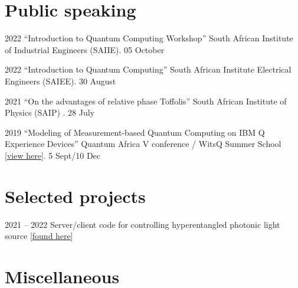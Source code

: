 \documentclass[10pt]{extreport}
\begin{document}
    \section*{Public speaking}

    \begin{tablist}
          \item[2022] \tab{}\enquote{Introduction to Quantum Computing Workshop} South African Institute of Industrial Engineers (SAIIE). 05 October
          \item[2022] \tab{}\enquote{Introduction to Quantum Computing} South African Institute Electrical Engineers (SAIEE). 30 August
          \item[2021] \tab{}\enquote{On the advantages of relative phase Toffolis} South
            African Institute of Physics (SAIP) . 28 July
          \item[2019] \tab{}\enquote{Modeling of Measurement-based Quantum Computing on
            IBM Q Experience Devices} Quantum Africa V conference / WitsQ Summer School
            [\href{https://github.com/Unathi-Skosana/posters-n-presentations/blob/main/posters/witsq-summer-school-2019/release/poster.pdf}{view
            here}].
            5 Sept/10 Dec
    \end{tablist}

    \section*{Selected projects}

    \begin{tablist}
      \item[2021 -- 2022] \tab{} Server/client code for controlling hyperentangled photonic light source
        [\href{https://github.com/Unathi-Skosana/hyperentangled-photons-masters-experiment}{found here}]
    \end{tablist}

    \section*{Miscellaneous}
\end{document}
